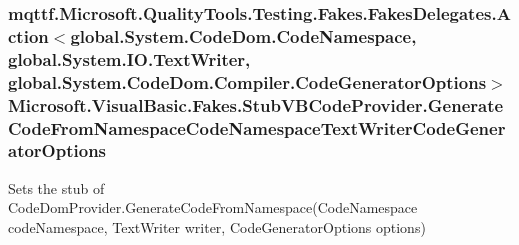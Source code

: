\hypertarget{class_microsoft_1_1_visual_basic_1_1_fakes_1_1_stub_v_b_code_provider_ab595500bfaf18940f5e7a1089ff91a0f}{
\subsubsection[{Generate\-Code\-From\-Namespace\-Code\-Namespace\-Text\-Writer\-Code\-Generator\-Options}]{\setlength{\rightskip}{0pt plus 5cm}mqttf.\-Microsoft.\-Quality\-Tools.\-Testing.\-Fakes.\-Fakes\-Delegates.\-Action$<$global.\-System.\-Code\-Dom.\-Code\-Namespace, global.\-System.\-I\-O.\-Text\-Writer, global.\-System.\-Code\-Dom.\-Compiler.\-Code\-Generator\-Options$>$ Microsoft.\-Visual\-Basic.\-Fakes.\-Stub\-V\-B\-Code\-Provider.\-Generate\-Code\-From\-Namespace\-Code\-Namespace\-Text\-Writer\-Code\-Generator\-Options}}\label{class_microsoft_1_1_visual_basic_1_1_fakes_1_1_stub_v_b_code_provider_ab595500bfaf18940f5e7a1089ff91a0f}


Sets the stub of Code\-Dom\-Provider.\-Generate\-Code\-From\-Namespace(\-Code\-Namespace code\-Namespace, Text\-Writer writer, Code\-Generator\-Options options)

